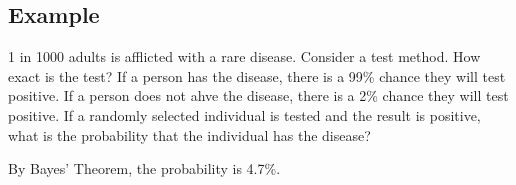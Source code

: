 \documentclass[letterpaper, 12pt]{math}
\begin{document}
\subsection*{Example}
1 in 1000 adults is afflicted with a rare disease. Consider a test method. How
exact is the test? If a person has the disease, there is a 99\% chance they will
test positive. If a person does not ahve the disease, there is a 2\% chance they
will test positive. If a randomly selected individual is tested and the result
is positive, what is the probability that the individual has the disease? \par
By Bayes' Theorem, the probability is 4.7\%.
\end{document}

